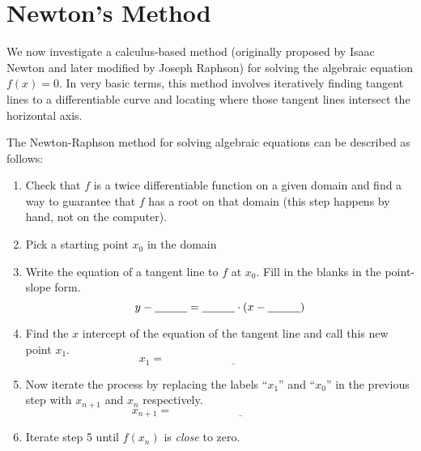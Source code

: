 \newpage\section{Newton's Method}
We now investigate a calculus-based method (originally proposed by Isaac Newton and later
modified by Joseph Raphson) for solving the algebraic equation $f(x)=0$. In very basic
terms, this method involves iteratively finding tangent lines to a differentiable curve
and locating where those tangent lines intersect the horizontal axis.
\begin{algorithm}
    The Newton-Raphson method for solving algebraic equations can be described as follows:
    \begin{enumerate}
        \item Check that $f$ is a twice differentiable function on a given domain and find
            a way to guarantee that $f$ has a root on that domain (this step happens by
            hand, not on the computer).
        \item Pick a starting point $x_0$ in the domain
        \item Write the equation of a tangent line to $f$ at $x_0$.  Fill in the blanks in
            the point-slope form.
            \[ y - \underline{\hspace{0.4in}} = \underline{\hspace{0.4in}} \cdot \left(
                x - \underline{\hspace{0.4in}} \right) \]
            \solution{
                \[ y - f(x_0) = f'(x_0) \left( x-x_0 \right) \]
            }
        \item Find the $x$ intercept of the equation of the tangent line and call this new
            point $x_1$.  
            \[ x_1 = \underline{\hspace{2in}} \]
            \solution{
                \[ x_1 = x_0 - \frac{f(x_0)}{f'(x_0)} \]
            }
        \item Now iterate the process by replacing the labels ``$x_1$'' and ``$x_0$'' in
            the previous step with $x_{n+1}$ and $x_{n}$ respectively.
            \[ x_{n+1} = \underline{\hspace{2in}} \]
            \solution{
                \[ x_{n+1} = x_{n} - \frac{f(x_n)}{f'(x_n)} \]
            }
        \item Iterate step 5 until $f(x_{n})$ is {\it close} to zero.
    \end{enumerate}
\end{algorithm}

